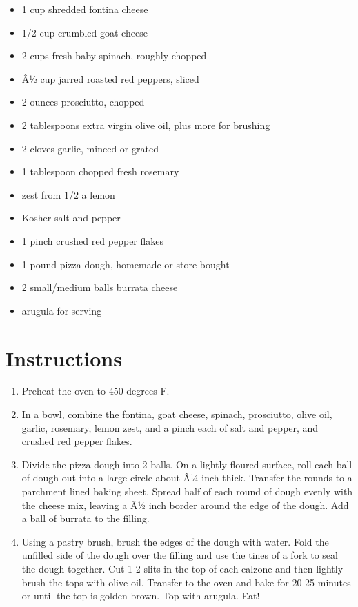 \documentclass[
  letterpaper,
  DIV=11,
  numbers=noendperiod,
  titlepage=false]{scrreprt}
\providecommand{\tightlist}{%
  \setlength{\itemsep}{0pt}\setlength{\parskip}{0pt}}\usepackage{longtable,booktabs,array}
\begin{document}
\begin{itemize}
\tightlist
\item
  1 cup shredded fontina cheese
\item
  1/2 cup crumbled goat cheese
\item
  2 cups fresh baby spinach, roughly chopped
\item
  Â½ cup jarred roasted red peppers, sliced
\item
  2 ounces prosciutto, chopped
\item
  2 tablespoons extra virgin olive oil, plus more for brushing
\item
  2 cloves garlic, minced or grated
\item
  1 tablespoon chopped fresh rosemary
\item
  zest from 1/2 a lemon
\item
  Kosher salt and pepper
\item
  1 pinch crushed red pepper flakes
\item
  1 pound pizza dough, homemade or store-bought
\item
  2 small/medium balls burrata cheese
\item
  arugula for serving
\end{itemize}

\section{Instructions}\label{instructions-42}

\begin{enumerate}
\def\labelenumi{\arabic{enumi}.}
\tightlist
\item
  Preheat the oven to 450 degrees F.
\item
  In a bowl, combine the fontina, goat cheese, spinach, prosciutto,
  olive oil, garlic, rosemary, lemon zest, and a pinch each of salt and
  pepper, and crushed red pepper flakes.
\item
  Divide the pizza dough into 2 balls. On a lightly floured surface,
  roll each ball of dough out into a large circle about Â¼ inch thick.
  Transfer the rounds to a parchment lined baking sheet. Spread half of
  each round of dough evenly with the cheese mix, leaving a Â½ inch
  border around the edge of the dough. Add a ball of burrata to the
  filling.
\item
  Using a pastry brush, brush the edges of the dough with water. Fold
  the unfilled side of the dough over the filling and use the tines of a
  fork to seal the dough together. Cut 1-2 slits in the top of each
  calzone and then lightly brush the tops with olive oil. Transfer to
  the oven and bake for 20-25 minutes or until the top is golden brown.
  Top with arugula. Eat!
\end{enumerate}
\end{document}

